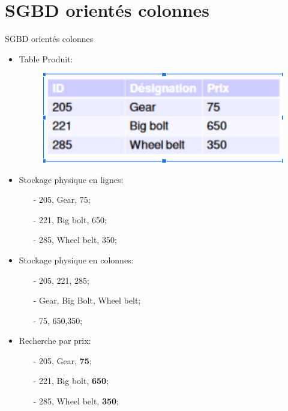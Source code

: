 \section[SGBD orientés colonnes]{SGBD orientés colonnes}
\begin{frame}{SGBD orientés colonnes}
    \begin{itemize}\itemsep1em
        \item Table Produit: 
        \begin{figure}
            \centering
            \includegraphics[scale=0.5]{figures/product.PNG}
        \end{figure}
        \item Stockage physique en lignes: 
        \begin{itemize}
            \item[-] 205, Gear, 75;
            \item[-] 221, Big bolt, 650;
            \item[-] 285, Wheel belt, 350;
        \end{itemize}
        \item Stockage physique en colonnes: 
        \begin{itemize}
            \item[-] 205, 221, 285; 
            \item[-] Gear, Big Bolt, Wheel belt;
            \item[-] 75, 650,350;
        \end{itemize}
        \item Recherche par prix:\\
    	\begin{minipage}{0.4\linewidth}
    	   \begin{itemize}
                \item[-] 205, Gear, \textbf{75};
                \item[-] 221, Big bolt, \textbf{650};
                \item[-] 285, Wheel belt, \textbf{350};
           \end{itemize}

\end{minipage}
\end{itemize}
\end{frame}
